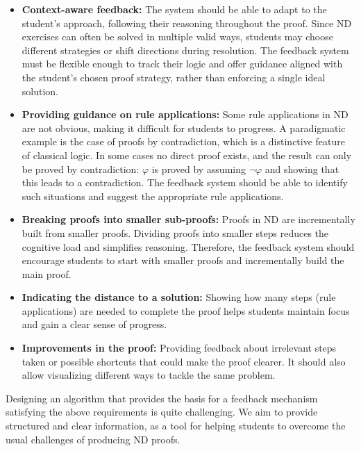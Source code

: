 \begin{itemize}

\item \textbf {Context-aware feedback:} The system should be able to adapt to the student's approach, following their reasoning throughout the proof. Since \gls{ND} exercises can often be solved in multiple valid ways, students may choose different strategies or shift directions during resolution. The feedback system must be flexible enough to track their logic and offer guidance aligned with the student's chosen proof strategy, rather than enforcing a single ideal solution.

\item \textbf {Providing guidance on rule applications:} Some rule applications in \gls{ND} are not obvious, making it difficult for students to progress. A paradigmatic example is the case of proofs by contradiction, which is a distinctive feature of classical logic. In some cases no direct proof exists, and the result can only be proved by contradiction: \(\varphi\) is proved by assuming \(\neg \varphi\) and showing that this leads to a contradiction. The feedback system should be able to identify such situations and suggest the appropriate rule applications.

\item \textbf {Breaking proofs into smaller sub-proofs:} Proofs in ND are incrementally built from smaller proofs. Dividing proofs into smaller steps reduces the cognitive load and simplifies reasoning. Therefore, the feedback system should encourage students to start with smaller proofs and incrementally build the main proof. 

\item \textbf{Indicating the distance to a solution:} Showing how many steps (rule applications) are needed to complete the proof helps students maintain focus and gain a clear sense of progress.

\item \textbf{Improvements in the proof:} Providing feedback about irrelevant steps taken or possible shortcuts that could make the proof clearer. It should also allow visualizing different ways to tackle the same problem.

\end{itemize}

Designing an algorithm that provides the basis for a feedback mechanism satisfying the above requirements is quite challenging. We aim to provide structured and clear information, as a tool for helping students to overcome the usual challenges of producing \gls{ND} proofs.

